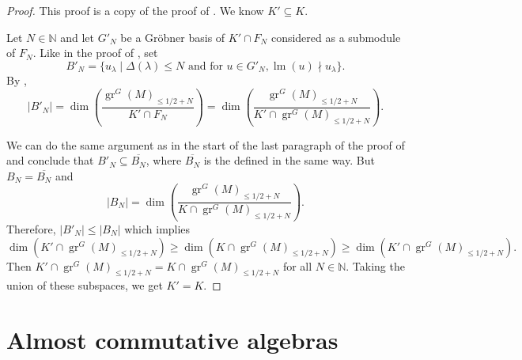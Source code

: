\documentclass[a4paper, 12pt, reqno]{amsart}
\theoremstyle{remark}
\numberwithin{equation}{subsection}
\DeclareMathOperator{\gr}{gr}
\DeclareMathOperator{\lm}{lm}
\begin{document}
\begin{proof}
  This proof is a copy of the proof of .
  We know $K' \subseteq K$.
  
  Let $N \in \mathbb{N}$ and let $G'_N$ be a Gr\"{o}bner basis of $K' \cap F_N$ considered as a submodule of $F_N$.
  Like in the proof of , set
  \begin{equation*}
    B'_N = \{u_{\lambda} \mid \Delta(\lambda) \le N\text{ and for }u \in G'_N, \lm(u) \nmid u_{\lambda}\}.
  \end{equation*}
  By \cite[Proposition 3.6.4]{adams_introduction_1994},
  \begin{equation*}
    |B'_N| = \dim\left(\frac{\gr^G(M)_{\le 1/2 + N}}{K' \cap F_N}\right) = \dim\left(\frac{\gr^G(M)_{\le 1/2 + N}}{K' \cap \gr^G(M)_{\le 1/2 + N}}\right).
  \end{equation*}

  We can do the same argument as in the start of the last paragraph of the proof of  and conclude that $B'_N \subseteq \overline{B_N}$, where $\overline{B_N}$ is the defined in the same way.
  But $B_N = \overline{B_N}$ and
  \begin{equation*}
    |B_N| = \dim\left(\frac{\gr^G(M)_{\le 1/2 + N}}{K \cap \gr^G(M)_{\le 1/2 + N}}\right).
  \end{equation*}
  Therefore, $|B'_N| \le |B_N|$ which implies
  \begin{equation*}
    \dim(K' \cap \gr^G(M)_{\le 1/2 + N}) \ge \dim(K \cap \gr^G(M)_{\le 1/2 + N}) \ge \dim(K' \cap \gr^G(M)_{\le 1/2 + N}).
  \end{equation*}
  Then $K' \cap \gr^G(M)_{\le 1/2 + N} = K \cap \gr^G(M)_{\le 1/2 + N}$ for all $N \in \mathbb{N}$.
  Taking the union of these subspaces, we get $K' = K$.
\end{proof}


\appendix
\section{Almost commutative algebras}
\label{sec:almost-comm-algebr}
\end{document}
